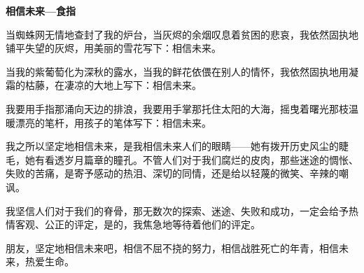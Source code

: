 
\acknowledgement
\begin{center} 
    {\sihao\bfseries 相信未来---食指}\\[3pt]
\end{center}    
当蜘蛛网无情地查封了我的炉台，当灰烬的余烟叹息着贫困的悲哀，我依然固执地铺平失望的灰烬，用美丽的雪花写下：相信未来。

当我的紫葡萄化为深秋的露水，当我的鲜花依偎在别人的情怀，我依然固执地用凝霜的枯藤，在凄凉的大地上写下：相信未来。

我要用手指那涌向天边的排浪，我要用手掌那托住太阳的大海，摇曳着曙光那枝温暖漂亮的笔杆，用孩子的笔体写下：相信未来。

我之所以坚定地相信未来，是我相信未来人们的眼睛——她有拨开历史风尘的睫毛，她有看透岁月篇章的瞳孔。不管人们对于我们腐烂的皮肉，那些迷途的惆怅、失败的苦痛，是寄予感动的热泪、深切的同情，还是给以轻蔑的微笑、辛辣的嘲讽。

我坚信人们对于我们的脊骨，那无数次的探索、迷途、失败和成功，一定会给予热情客观、公正的评定，是的，我焦急地等待着他们的评定。

朋友，坚定地相信未来吧，相信不屈不挠的努力，相信战胜死亡的年青，相信未来，热爱生命。

